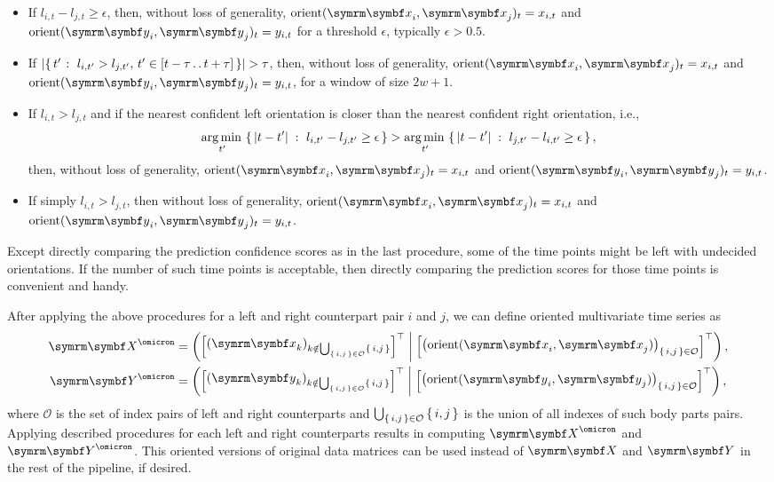 \begin{itemize}
	\item If $l_{i,t} - l_{j,t} \geq  \epsilon$, then, without loss of generality, $\orient{\V{x}_i, \V{x}_j}_t=x_{i,t}$ and $\orient{\V{y}_i, \V{y}_j}_t=y_{i,t}$ for a threshold $\epsilon$, typically $\epsilon > 0.5$.

	\item If $\card*{\Set{t^{\prime}}{l_{i,t^{\prime}} > l_{j,t^{\prime}}, \, t^{\prime} \in [t-\tau \rangedots t+\tau]}} > \tau$, then, without loss of generality, $\orient{\V{x}_i, \V{x}_j}_t=x_{i,t}$ and $\orient{\V{y}_i, \V{y}_j}_t=y_{i,t}$, for a window of size $2w+1$.

	\item If $l_{i,t} > l_{j,t}$ and if the nearest confident left orientation is closer than the nearest confident right orientation, i.e., $$\argmin_{t^{\prime}} \Set{\abs*{t-t^{\prime}}}{l_{i,t^{\prime}} - l_{j,t^{\prime}} \geq \epsilon} > \argmin_{t^{\prime}} \Set{\abs*{t - t^{\prime}}}{l_{j,t^{\prime}} - l_{i,t^{\prime}} \geq \epsilon},$$ then, without loss of generality, $\orient{\V{x}_i, \V{x}_j}_t=x_{i,t}$ and $\orient{\V{y}_i, \V{y}_j}_t=y_{i,t}$.
	\item If simply $l_{i,t} > l_{j,t}$, then without loss of generality, $\orient{\V{x}_i, \V{x}_j}_t=x_{i,t}$ and $\orient{\V{y}_i, \V{y}_j}_t=y_{i,t}$.
\end{itemize}

Except directly comparing the prediction confidence scores as in the last procedure, some of the time points might be left with undecided orientations.
If the number of such time points is acceptable, then directly comparing the prediction scores for those time points is convenient and handy.

After applying the above procedures for a left and right counterpart pair $i$ and $j$, we can define oriented multivariate time series as
\begin{equation}
	\begin{aligned}
		\V{X}^{\omicron} & = \rbr{\qmatrix{\rbr{\V{x}_k}_{k \notin \bigcup_{\set{i,j} \in \mathcal{O}} \set{i,j}}}^\top \concat \qmatrix{\rbr{\orient{\V{x}_i, \V{x}_j}}_{\set{i,j} \in \mathcal{O}}}^\top}, \\
		\V{Y}^{\omicron} & = \rbr{\qmatrix{\rbr{\V{y}_k}_{k \notin \bigcup_{\set{i,j} \in \mathcal{O}} \set{i,j}}}^\top \concat \qmatrix{\rbr{\orient{\V{y}_i, \V{y}_j}}_{\set{i,j} \in \mathcal{O}}}^\top},
	\end{aligned}
\end{equation}
where $\mathcal{O}$ is the set of index pairs of left and right counterparts and $\bigcup_{\set{i,j} \in \mathcal{O}} \set{i,j}$ is the union of all indexes of such body parts pairs.
Applying described procedures for each left and right counterparts results in computing $\V{X}^{\omicron}$ and $\V{Y}^{\omicron}$.
This oriented versions of original data matrices can be used instead of $\V{X}$ and $\V{Y}$ in the rest of the pipeline, if desired.

